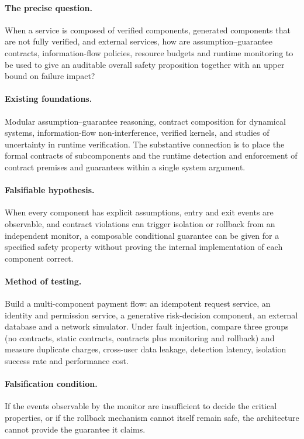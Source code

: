 \paragraph{The precise question.}
When a service is composed of verified components, generated components that are not fully
verified, and external services, how are assumption--guarantee contracts, information-flow
policies, resource budgets and runtime monitoring to be used to give an auditable overall
safety proposition together with an upper bound on failure impact?

\paragraph{Existing foundations.}
Modular assumption--guarantee reasoning, contract composition for dynamical systems,
information-flow non-interference, verified kernels, and studies of uncertainty in runtime
verification. The substantive connection is to place the formal contracts of subcomponents
and the runtime detection and enforcement of contract premises and guarantees within a
single system argument.

\paragraph{Falsifiable hypothesis.}
When every component has explicit assumptions, entry and exit events are observable, and
contract violations can trigger isolation or rollback from an independent monitor, a
composable conditional guarantee can be given for a specified safety property without
proving the internal implementation of each component correct.

\paragraph{Method of testing.}
Build a multi-component payment flow: an idempotent request service, an identity and
permission service, a generative risk-decision component, an external database and a
network simulator. Under fault injection, compare three groups (no contracts, static
contracts, contracts plus monitoring and rollback) and measure duplicate charges,
cross-user data leakage, detection latency, isolation success rate and performance cost.

\paragraph{Falsification condition.}
If the events observable by the monitor are insufficient to decide the critical properties,
or if the rollback mechanism cannot itself remain safe, the architecture cannot provide the
guarantee it claims.

